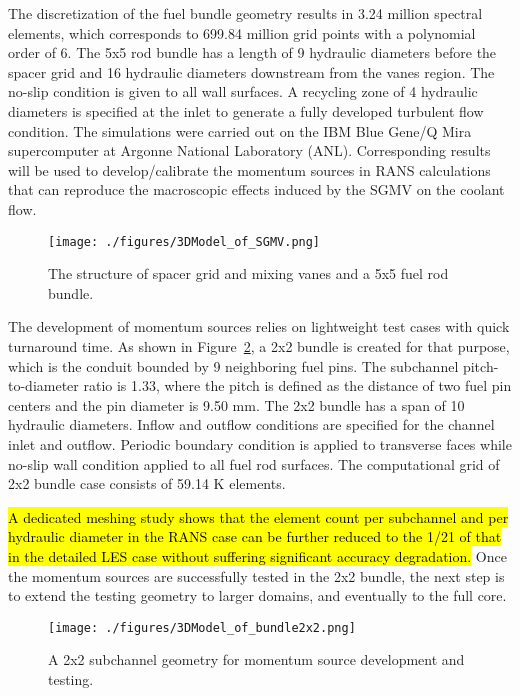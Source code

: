 The discretization of the fuel bundle geometry results in 3.24 million spectral elements, which corresponds to 699.84 million grid points with a polynomial order of 6.
The 5x5 rod bundle has a length of 9 hydraulic diameters before the spacer grid and 16 hydraulic diameters downstream from the vanes region.
The no-slip condition is given to all wall surfaces.
A recycling zone of 4 hydraulic diameters is specified at the inlet to generate a fully developed turbulent flow condition.
The simulations were carried out on the IBM Blue Gene/Q Mira supercomputer at Argonne National Laboratory (ANL).
Corresponding results will be used to develop/calibrate the momentum sources in RANS calculations that can reproduce the macroscopic effects induced by the SGMV on the coolant flow.

\begin{figure}[!ht]
\centering
\texttt{[image: ./figures/3DModel\_of\_SGMV.png]}
\caption{The structure of spacer grid and mixing vanes and a 5x5 fuel rod bundle.}
\label{fig:sgmvcad}
\end{figure}

The development of momentum sources relies on lightweight test cases with quick turnaround time.
As shown in Figure~\ref{fig:model2x2}, a 2x2 bundle is created for that purpose, which is the conduit bounded by 9 neighboring fuel pins.
The subchannel pitch-to-diameter ratio is 1.33, where the pitch is defined as the distance of two fuel pin centers and the pin diameter is 9.50 mm.
The 2x2 bundle has a span of 10 hydraulic diameters.
Inflow and outflow conditions are specified for the channel inlet and outflow.
Periodic boundary condition is applied to transverse faces while no-slip wall condition applied to all fuel rod surfaces.
The computational grid of 2x2 bundle case consists of 59.14 K elements.

\hl{A dedicated meshing study shows that the element count per subchannel and per hydraulic diameter in the RANS case can be further reduced to the 1/21 of that in the detailed LES case without suffering significant accuracy degradation.}
Once the momentum sources are successfully tested in the 2x2 bundle, the next step is to extend the testing geometry to larger domains, and eventually to the full core.

\begin{figure}[!ht]
\centering
\texttt{[image: ./figures/3DModel\_of\_bundle2x2.png]}
\caption{A 2x2 subchannel geometry for momentum source development and testing.}
\label{fig:model2x2}
\end{figure}

